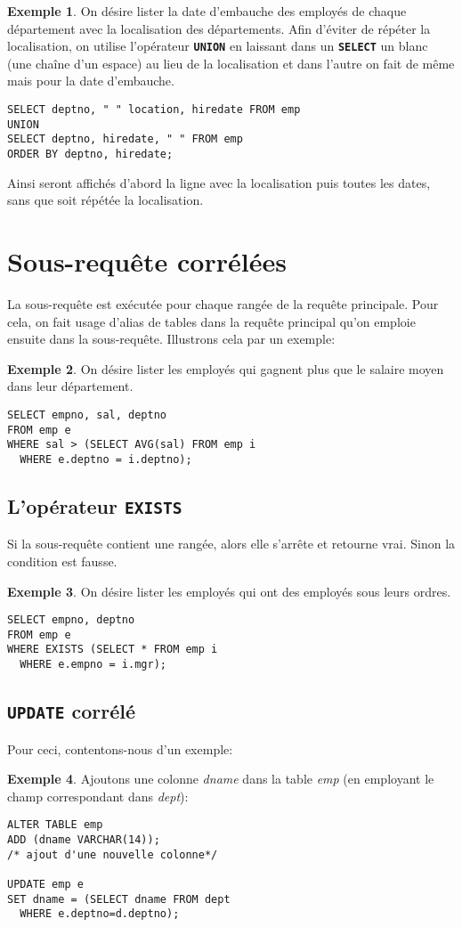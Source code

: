 \documentclass[a4paper, 12pt]{report}
\newcommand{\textSQL}[1]{\texttt{\textbf{#1}}}
\theoremstyle{definition} \newtheorem{ex}{Exemple}
\begin{document}
\begin{ex} \label{ex:blancs}
On désire lister la date d'embauche des employés de chaque département avec la localisation des départements. Afin d'éviter de répéter la localisation, on utilise l'opérateur \textSQL{UNION} en laissant dans un \textSQL{SELECT} un blanc (une chaîne d'un espace) au lieu de la localisation et dans l'autre on fait de même mais pour la date d'embauche. 
\begin{lstlisting}[frame=single]
SELECT deptno, " " location, hiredate FROM emp
UNION
SELECT deptno, hiredate, " " FROM emp
ORDER BY deptno, hiredate;
\end{lstlisting} 
Ainsi seront affichés d'abord la ligne avec la localisation puis toutes les dates, sans que soit répétée la localisation.
\end{ex}

\section{Sous-requête corrélées}
La sous-requête est exécutée pour chaque rangée de la requête principale. Pour cela, on fait usage d'alias de tables dans la requête principal qu'on emploie ensuite dans la sous-requête. Illustrons cela par un exemple:
\begin{ex}
On désire lister les employés qui gagnent plus que le salaire moyen dans leur département.
\begin{lstlisting}[frame=single]
SELECT empno, sal, deptno
FROM emp e
WHERE sal > (SELECT AVG(sal) FROM emp i
  WHERE e.deptno = i.deptno);
\end{lstlisting}
\end{ex}

\subsection*{L'opérateur \textSQL{EXISTS}}

Si la sous-requête contient une rangée, alors elle s'arrête et retourne vrai. Sinon la condition est fausse.
\begin{ex}
On désire lister les employés qui ont des employés sous leurs ordres.
\begin{lstlisting}[frame=single]
SELECT empno, deptno
FROM emp e
WHERE EXISTS (SELECT * FROM emp i
  WHERE e.empno = i.mgr);
\end{lstlisting}
\end{ex}


\subsection*{\textSQL{UPDATE} corrélé}

Pour ceci, contentons-nous d'un exemple:
\begin{ex}
Ajoutons une colonne \emph{dname} dans la table \emph{emp} (en employant le champ correspondant dans \emph{dept}):
\begin{lstlisting}[frame=single]
ALTER TABLE emp
ADD (dname VARCHAR(14));
/* ajout d'une nouvelle colonne*/

UPDATE emp e
SET dname = (SELECT dname FROM dept
  WHERE e.deptno=d.deptno);
\end{lstlisting}
\end{ex}
\end{document}
